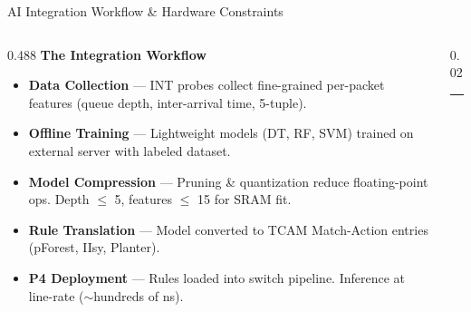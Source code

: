 {
\begin{frame}{AI Integration Workflow \& Hardware Constraints}


  \begin{columns}[T, totalwidth=\textwidth]

    \begin{column}{0.488\textwidth}
      {\color{HUAblue}\bfseries\small The Integration Workflow}
      \vspace{6pt}
      \begin{itemize}
        \setlength\itemsep{8pt}
        \footnotesize
        \item[\textcolor{HUAblue}{\bfseries 1}]
          \textbf{Data Collection} ---
          INT probes collect fine-grained
          per-packet features (queue depth,
          inter-arrival time, 5-tuple).
        \item[\textcolor{HUAblue}{\bfseries 2}]
          \textbf{Offline Training} ---
          Lightweight models (DT, RF, SVM)
          trained on external server
          with labeled dataset.
        \item[\textcolor{HUAblue}{\bfseries 3}]
          \textbf{Model Compression} ---
          Pruning \& quantization reduce
          floating-point ops. Depth $\leq$ 5,
          features $\leq$ 15 for SRAM fit.
        \item[\textcolor{HUAblue}{\bfseries 4}]
          \textbf{Rule Translation} ---
          Model converted to TCAM
          Match-Action entries
          (pForest, IIsy, Planter).
        \item[\textcolor{HUAblue}{\bfseries 5}]
          \textbf{P4 Deployment} ---
          Rules loaded into switch pipeline.
          Inference at line-rate
          ($\sim$hundreds of ns).
      \end{itemize}
    \end{column}

    \begin{column}{0.02\textwidth}
      \textcolor{HUAlight}{\rule{0.5pt}{0.55\textheight}}
    \end{column}


\end{columns}
\end{frame}}
